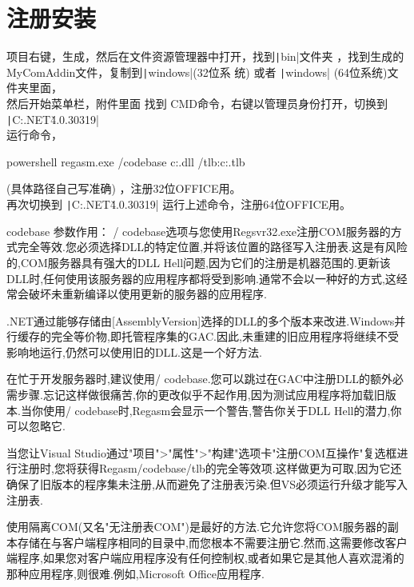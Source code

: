 \documentclass[math,code]{amznotes}
\begin{document}
	\section{注册安装}
	项目右键，生成，然后在文件资源管理器中打开，找到\texttt|bin\Debug|文件夹 ，找到生成的MyComAddin文件，复制到\texttt|windows|(32位系
	统) 或者 \texttt|windows| (64位系统)文件夹里面，\\	
	然后开始菜单栏，附件里面 找到 CMD命令，右键以管理员身份打开，切换到\\ \texttt|C:\Windows\Microsoft.NET\Framework\v4.0.30319| \\
	运行命令，
	\begin{amzcode}{powershell}
		regasm.exe /codebase c:\windows{}\MyComAddin.dll /tlb:c:\windows{}\MyComAddin.tlb 
	\end{amzcode}
	(具体路径自己写准确) ，注册32位OFFICE用。\\
	再次切换到 \texttt|C:\Windows\Microsoft.NET\v4.0.30319| 运行上述命令，注册64位OFFICE用。
	\begin{notebox}
		codebase 参数作用\cite{RegAsm_codebase}：
		/ codebase选项与您使用Regsvr32.exe注册COM服务器的方式完全等效.您必须选择DLL的特定位置,并将该位置的路径写入注册表.这是有风险的,COM服务器具有强大的DLL Hell问题,因为它们的注册是机器范围的.更新该DLL时,任何使用该服务器的应用程序都将受到影响.通常不会以一种好的方式,这经常会破坏未重新编译以使用更新的服务器的应用程序.
		
		.NET通过能够存储由[AssemblyVersion]选择的DLL的多个版本来改进.Windows并行缓存的完全等价物,即托管程序集的GAC.因此,未重建的旧应用程序将继续不受影响地运行,仍然可以使用旧的DLL.这是一个好方法.
		
		在忙于开发服务器时,建议使用/ codebase.您可以跳过在GAC中注册DLL的额外必需步骤.忘记这样做很痛苦,你的更改似乎不起作用\cite{comAddin_LoadFailure,VSTO_comAddin_LoadFailure},因为测试应用程序将加载旧版本.当你使用/ codebase时,Regasm会显示一个警告,警告你关于DLL Hell的潜力,你可以忽略它.
		
		当您让Visual Studio通过"项目">"属性">"构建"选项卡"注册COM互操作"复选框进行注册时,您将获得Regasm/codebase/tlb的完全等效项.这样做更为可取,因为它还确保了旧版本的程序集未注册,从而避免了注册表污染.但VS必须运行升级才能写入注册表.
		
		使用隔离COM(又名"无注册表COM")是最好的方法.它允许您将COM服务器的副本存储在与客户端程序相同的目录中,而您根本不需要注册它.然而,这需要修改客户端程序,如果您对客户端应用程序没有任何控制权,或者如果它是其他人喜欢混淆的那种应用程序,则很难.例如,Microsoft Office应用程序.
	\end{notebox}
\end{document}
